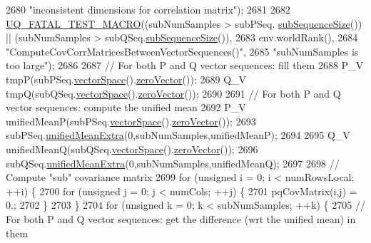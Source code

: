 \begin{DoxyCode}
2680                       \textcolor{stringliteral}{"inconsistent dimensions for correlation matrix"});
2681 
2682   \hyperlink{_defines_8h_a56d63d18d0a6d45757de47fcc06f574d}{UQ\_FATAL\_TEST\_MACRO}((subNumSamples > subPSeq.
      \hyperlink{class_q_u_e_s_o_1_1_base_vector_sequence_afd6278702d40bdf1044697bbd6ad1957}{subSequenceSize}()) || (subNumSamples > subQSeq.\hyperlink{class_q_u_e_s_o_1_1_base_vector_sequence_afd6278702d40bdf1044697bbd6ad1957}{subSequenceSize}()),
2683                       env.worldRank(),
2684                       \textcolor{stringliteral}{"ComputeCovCorrMatricesBetweenVectorSequences()"},
2685                       \textcolor{stringliteral}{"subNumSamples is too large"});
2686 
2687   \textcolor{comment}{// For both P and Q vector sequences: fill them}
2688   P\_V tmpP(subPSeq.\hyperlink{class_q_u_e_s_o_1_1_base_vector_sequence_af9a4dd979a2fa8dee85bb07793b59ba2}{vectorSpace}().\hyperlink{class_q_u_e_s_o_1_1_vector_space_a92e963bb5cab3eecd290dfe4b8f03b04}{zeroVector}());
2689   Q\_V tmpQ(subQSeq.\hyperlink{class_q_u_e_s_o_1_1_base_vector_sequence_af9a4dd979a2fa8dee85bb07793b59ba2}{vectorSpace}().\hyperlink{class_q_u_e_s_o_1_1_vector_space_a92e963bb5cab3eecd290dfe4b8f03b04}{zeroVector}());
2690 
2691   \textcolor{comment}{// For both P and Q vector sequences: compute the unified mean}
2692   P\_V unifiedMeanP(subPSeq.\hyperlink{class_q_u_e_s_o_1_1_base_vector_sequence_af9a4dd979a2fa8dee85bb07793b59ba2}{vectorSpace}().\hyperlink{class_q_u_e_s_o_1_1_vector_space_a92e963bb5cab3eecd290dfe4b8f03b04}{zeroVector}());
2693   subPSeq.\hyperlink{class_q_u_e_s_o_1_1_base_vector_sequence_a6ee252d07395644a9175aabf2bad7aed}{unifiedMeanExtra}(0,subNumSamples,unifiedMeanP);
2694 
2695   Q\_V unifiedMeanQ(subQSeq.\hyperlink{class_q_u_e_s_o_1_1_base_vector_sequence_af9a4dd979a2fa8dee85bb07793b59ba2}{vectorSpace}().\hyperlink{class_q_u_e_s_o_1_1_vector_space_a92e963bb5cab3eecd290dfe4b8f03b04}{zeroVector}());
2696   subQSeq.\hyperlink{class_q_u_e_s_o_1_1_base_vector_sequence_a6ee252d07395644a9175aabf2bad7aed}{unifiedMeanExtra}(0,subNumSamples,unifiedMeanQ);
2697 
2698   \textcolor{comment}{// Compute "sub" covariance matrix}
2699   \textcolor{keywordflow}{for} (\textcolor{keywordtype}{unsigned} i = 0; i < numRowsLocal; ++i) \{
2700     \textcolor{keywordflow}{for} (\textcolor{keywordtype}{unsigned} j = 0; j < numCols; ++j) \{
2701       pqCovMatrix(i,j) = 0.;
2702     \}
2703   \}
2704   \textcolor{keywordflow}{for} (\textcolor{keywordtype}{unsigned} k = 0; k < subNumSamples; ++k) \{
2705     \textcolor{comment}{// For both P and Q vector sequences: get the difference (wrt the unified mean) in them}

\end{DoxyCode}
